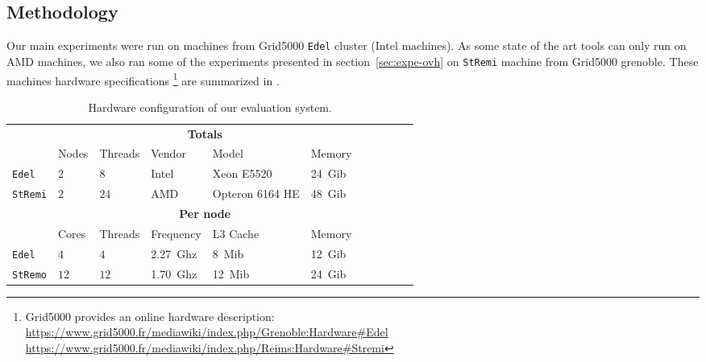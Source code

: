 
\subsection{Methodology}


Our main experiments were run on  machines from Grid5000 \texttt{Edel}
cluster (Intel machines).
    As some state of the art tools can only run on AMD machines, we also ran
    some of the experiments presented in section~\ref{sec:expe-ovh} on
    \texttt{StRemi} machine from Grid5000 grenoble.
    These machines hardware specifications%
   \footnote{Grid5000 provides an online hardware description:\\
       \url{https://www.grid5000.fr/mediawiki/index.php/Grenoble:Hardware\#Edel}
       \\\url{https://www.grid5000.fr/mediawiki/index.php/Reims:Hardware\#Stremi}}
    are summarized in .

\begin{table}[htb]
    \centering
    \begin{tabular}{lllllllllll}
        \toprule
        & \multicolumn{5}{c}{\textbf{Totals}}\\
        & Nodes & Threads & Vendor & Model & Memory \\
        \cmidrule(lr){2-6}
        \texttt{Edel}    & $2$ & $8$  & Intel & Xeon E5520      & \SI{24}{Gib} \\
        \texttt{StRemi} & $2$ & $24$ & AMD   & Opteron 6164 HE & \SI{48}{Gib} \\
        \midrule
        & \multicolumn{5}{c}{\textbf{Per node}}\\
        & Cores & Threads & Frequency & L3 Cache & Memory \\
        \cmidrule(lr){2-6}
        \texttt{Edel}   & $4$  & $4$   & \SI{2.27}{Ghz}& \SI{8}{Mib}  & \SI{12}{Gib} \\
        \texttt{StRemo} & $12$ & $12$  & \SI{1.70}{Ghz}& \SI{12}{Mib} & \SI{24}{Gib}\\
        \bottomrule
    \end{tabular}
    \caption{Hardware configuration of our evaluation system.}
    \label{tab:hw}
\end{table}

